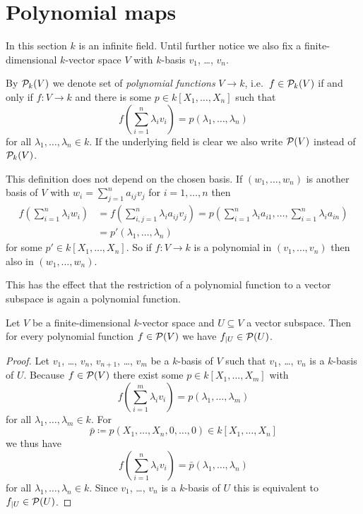 




\section{Polynomial maps}


In this section $k$ is an infinite field. Until further notice we also fix a finite-dimensional $k$-vector space $V$ with $k$-basis $v_1$, \dots, $v_n$.


\begin{defi}
 By $\mathcal{P}_k(V)$ we denote set of \emph{polynomial functions} $V \to k$, i.e.\ $f \in \mathcal{P}_k(V)$ if and only if $f \colon V \to k$ and there is some $p \in k[X_1, \dotsc, X_n]$ such that
 \[
  f\left( \sum_{i=1}^n \lambda_i v_i \right) = p(\lambda_1, \dotsc, \lambda_n)
 \]
 for all $\lambda_1, \dotsc, \lambda_n \in k$. If the underlying field is clear we also write $\mathcal{P}(V)$ instead of $\mathcal{P}_k(V)$.
\end{defi}


This definition does not depend on the chosen basis. If $(w_1, \dotsc, w_n)$ is another basis of $V$ with $w_i = \sum_{j=1}^n a_{ij} v_j$ for $i = 1, \dotsc, n$ then
\begin{align*}
 f\left( \sum_{i=1}^n \lambda_i w_i \right)
 &= f\left( \sum_{i,j=1}^n \lambda_i a_{ij} v_j \right)
 = p\left( \sum_{i=1}^n \lambda_i a_{i1}, \dotsc, \sum_{i=1}^n \lambda_{i} a_{in} \right)\\
 &= p'(\lambda_1, \dotsc, \lambda_n)
\end{align*}
for some $p' \in k[X_1, \dotsc, X_n]$. So if $f \colon V \to k$ is a polynomial in $(v_1, \dotsc, v_n)$ then also in $(w_1, \dotsc, w_n)$.

This has the effect that the restriction of a polynomial function to a vector subspace is again a polynomial function.

\begin{lem}
 Let $V$ be a finite-dimensional $k$-vector space and $U \subseteq V$ a vector subspace. Then for every polynomial function $f \in \mathcal{P}(V)$ we have $f_{|U} \in \mathcal{P}(U)$.
\end{lem}
\begin{proof}
 Let $v_1$, \dots, $v_n$, $v_{n+1}$, \dots, $v_m$ be a $k$-basis of $V$ such that $v_1$, \dots, $v_n$ is a $k$-basis of $U$. Because $f \in \mathcal{P}(V)$ there exist some $p \in k[X_1, \dotsc, X_m]$ with
 \[
  f\left( \sum_{i=1}^m \lambda_i v_i \right) = p(\lambda_1, \dotsc, \lambda_m)
 \]
 for all $\lambda_1, \dotsc, \lambda_m \in k$. For
 \[
  \bar{p} \coloneqq p(X_1, \dotsc, X_n, 0, \dotsc, 0) \in k[X_1, \dotsc, X_n]
 \]
 we thus have
 \[
  f\left( \sum_{i=1}^n \lambda_i v_i \right) = \bar{p}(\lambda_1, \dotsc, \lambda_n)
 \]
 for all $\lambda_1, \dotsc, \lambda_n \in k$. Since $v_1$, \dots, $v_n$ is a $k$-basis of $U$ this is equivalent to $f_{|U} \in \mathcal{P}(U)$.
\end{proof}


